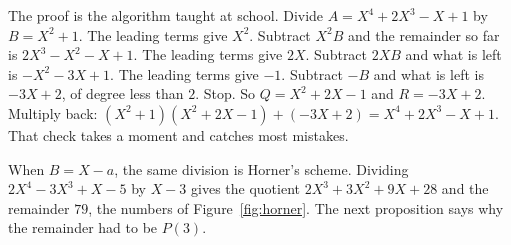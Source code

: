 \begin{examplex}
The proof is the algorithm taught at school. Divide $A=X^4+2X^3-X+1$ by $B=X^2+1$. The leading terms give $X^2$. Subtract $X^2B$ and the remainder so far is $2X^3-X^2-X+1$. The leading terms give $2X$. Subtract $2XB$ and what is left is $-X^2-3X+1$. The leading terms give $-1$. Subtract $-B$ and what is left is $-3X+2$, of degree less than $2$. Stop. So $Q=X^2+2X-1$ and $R=-3X+2$. Multiply back: $(X^2+1)(X^2+2X-1)+(-3X+2)=X^4+2X^3-X+1$. That check takes a moment and catches most mistakes.

When $B=X-a$, the same division is Horner's scheme. Dividing $2X^4-3X^3+X-5$ by $X-3$ gives the quotient $2X^3+3X^2+9X+28$ and the remainder $79$, the numbers of Figure~\ref{fig:horner}. The next proposition says why the remainder had to be $P(3)$.
\end{examplex}

